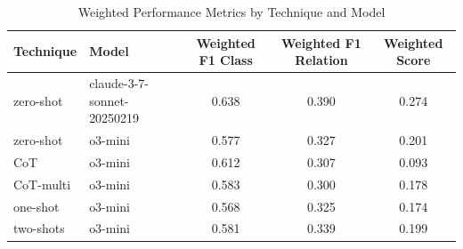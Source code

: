 \begin{table}[htbp]
\centering
\caption{Weighted Performance Metrics by Technique and Model}
\begin{tabular}{llccc}
\toprule
\textbf{Technique} & \textbf{Model} & \textbf{Weighted F1 Class} & \textbf{Weighted F1 Relation} & \textbf{Weighted Score} \\
\midrule
zero-shot & claude-3-7-sonnet-20250219 & 0.638 & 0.390 & 0.274 \\
zero-shot & o3-mini & 0.577 & 0.327 & 0.201 \\
\midrule
CoT & o3-mini & 0.612 & 0.307 & 0.093 \\
\midrule
CoT-multi & o3-mini & 0.583 & 0.300 & 0.178 \\
\midrule
one-shot & o3-mini & 0.568 & 0.325 & 0.174 \\
\midrule
two-shots & o3-mini & 0.581 & 0.339 & 0.199 \\
\bottomrule
\end{tabular}
\label{tab:weighted_performance}
\end{table}